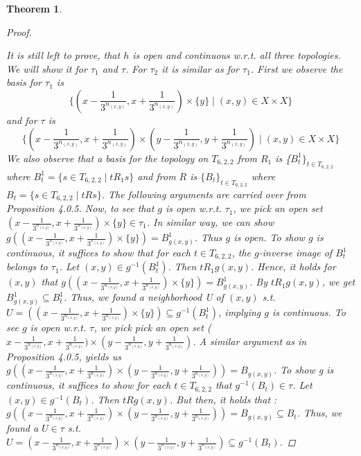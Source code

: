 \documentclass[12pt, a4paper]{scrartcl}
\newtheorem{theorem}[definition]{Theorem}
\begin{document}
\begin{theorem}
\begin{proof}
\begin{figure}[ht]
\begin{center}
\begin{tikzpicture}[scale=0.73]
    \end{tikzpicture}
    \caption{}
\end{center}
\end{figure}    
    It is still left to prove, that $h$ is open and continuous w.r.t. all three topologies. We will show it for $\tau_1$ and $\tau$. For $\tau_2$ it is similar as for $\tau_1$.\newline \newline
    First we observe the basis for $\tau_1$ is 
    $$\{(x - \frac{1}{3^{n_{(x,y)}}}, x +\frac{1}{3^{n_{(x,y)}}}) \times \{y\} \mid (x,y) \in X \times X\}$$
    and for $\tau$ is 
    $$\{(x - \frac{1}{3^{n_{(x,y)}}}, x +\frac{1}{3^{n_{(x,y)}}}) \times (y - \frac{1}{3^{n_{(x,y)}}}, y +\frac{1}{3^{n_{(x,y)}}}) \mid (x,y) \in X \times X\}$$
    We also observe that a basis for the topology on $T_{6,2,2}$ from $R_1$ is \{$B^1_t\}_{t \in T_{6,2,2}}$ where $B^1_t = \{s \in T_{6,2,2} \mid t R_1 s\}$ 
    and from $R$ is $\{B_t\}_{t \in T_{6,2,2}}$ where $B_t = \{s \in T_{6,2,2} \mid t R s\}$. The following arguments are carried over from Proposition 4.0.5. \newline
    Now, to see that $g$ is open w.r.t. $\tau_1$, we pick an open set $(x - \frac{1}{3^{n_{(x,y)}}}, x + \frac{1}{3^{n_{(x,y)}}}) \times \{y\} \in \tau_1$. 
    In similar way, we can show $g((x - \frac{1}{3^{n_{(x,y)}}}, x + \frac{1}{3^{n_{(x,y)}}}) \times \{y\}) = B^1_{g(x,y)}$. Thus $g$ is open.
    To show $g$ is continuous, it suffices to show that for each $t \in T_{6,2,2}$, the $g$-inverse image of $B^1_t$ belongs to $\tau_1$. Let $(x,y) \in g^{-1}(B^1_t)$. 
    Then $tR_1g(x,y)$. Hence, it holds for $(x,y)$ that $g((x - \frac{1}{3^{n_{(x,y)}}}, x + \frac{1}{3^{n_{(x,y)}}}) \times \{y\}) = B^1_{g(x,y)}$. By $t R_1g(x,y)$, we get
    $B^1_{g(x,y)} \subseteq B^1_t$. Thus, we found a neighborhood U of $(x,y)$ s.t. $U = ((x - \frac{1}{3^{n_{(x,y)}}}, x + \frac{1}{3^{n_{(x,y)}}}) \times \{y\}) \subseteq g^{-1}(B^1_t)$, implying $g$ is continuous.  \newline
    To see $g$ is open w.r.t. $\tau$, we pick pick an open set ($x- \frac{1}{3^{n_{(x,y)}}}, x+ \frac{1}{3^{n_{(x,y)}}}) \times (y- \frac{1}{3^{n_{(x,y)}}}, y+ \frac{1}{3^{n_{(x,y)}}})$. A similar argument as in Proposition 4.0.5, yields 
    us $g((x- \frac{1}{3^{n_{(x,y)}}}, x+ \frac{1}{3^{n_{(x,y)}}}) \times (y- \frac{1}{3^{n_{(x,y)}}}, y+ \frac{1}{3^{n_{(x,y)}}})) = B_{g(x,y)}$. \newline
    To show g is continuous, it suffices to show for each $t \in T_{6,2,2}$ that $g^{-1}(B_t) \in \tau$. Let $(x,y) \in g^{-1}(B_t)$. Then $tRg(x,y)$. But then, it holds that :
    $g((x- \frac{1}{3^{n_{(x,y)}}}, x+ \frac{1}{3^{n_{(x,y)}}}) \times (y- \frac{1}{3^{n_{(x,y)}}}, y+ \frac{1}{3^{n_{(x,y)}}})) = B_{g(x,y)} \subseteq B_t$. Thus, we found a $U \in \tau$ 
    s.t. $U = (x- \frac{1}{3^{n_{(x,y)}}}, x+ \frac{1}{3^{n_{(x,y)}}}) \times (y- \frac{1}{3^{n_{(x,y)}}}, y+ \frac{1}{3^{n_{(x,y)}}}) \subseteq g^{-1}(B_t)$.


\end{proof}
\end{theorem}
\end{document}
